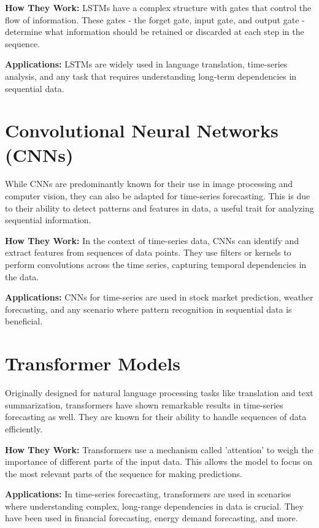 \documentclass{article}
\begin{document}
\textbf{How They Work:} LSTMs have a complex structure with gates that control the flow of information. These gates - the forget gate, input gate, and output gate - determine what information should be retained or discarded at each step in the sequence.

\textbf{Applications:} LSTMs are widely used in language translation, time-series analysis, and any task that requires understanding long-term dependencies in sequential data.

\section{Convolutional Neural Networks (CNNs)}
While CNNs are predominantly known for their use in image processing and computer vision, they can also be adapted for time-series forecasting. This is due to their ability to detect patterns and features in data, a useful trait for analyzing sequential information.

\textbf{How They Work:} In the context of time-series data, CNNs can identify and extract features from sequences of data points. They use filters or kernels to perform convolutions across the time series, capturing temporal dependencies in the data.

\textbf{Applications:} CNNs for time-series are used in stock market prediction, weather forecasting, and any scenario where pattern recognition in sequential data is beneficial.

\section{Transformer Models}

Originally designed for natural language processing tasks like translation and text summarization, transformers have shown remarkable results in time-series forecasting as well. They are known for their ability to handle sequences of data efficiently.

\textbf{How They Work:} Transformers use a mechanism called 'attention' to weigh the importance of different parts of the input data. This allows the model to focus on the most relevant parts of the sequence for making predictions.

\textbf{Applications:} In time-series forecasting, transformers are used in scenarios where understanding complex, long-range dependencies in data is crucial. They have been used in financial forecasting, energy demand forecasting, and more.
\end{document}
